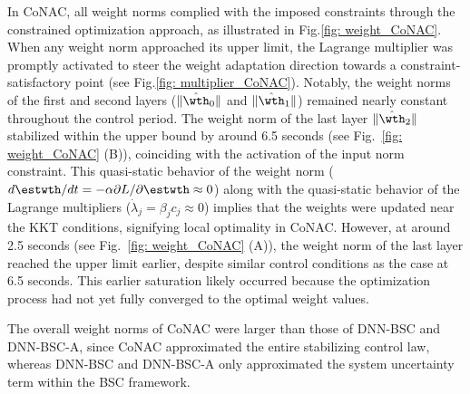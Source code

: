 \documentclass[lettersize,journal]{IEEEtran}
\begin{document}
In CoNAC, all weight norms complied with the imposed constraints through the constrained optimization approach, as illustrated in Fig.\ref{fig: weight_CoNAC}. When any weight norm approached its upper limit, the Lagrange multiplier was promptly activated to steer the weight adaptation direction towards a constraint-satisfactory point (see Fig.\ref{fig: multiplier_CoNAC}). Notably, the weight norms of the first and second layers ($\Vert {{{\hat \wth }_0}} \Vert$ and $\Vert {{{\hat \wth }_1}} \Vert$) remained nearly constant throughout the control period. The weight norm of the last layer $\Vert {{{\hat \wth }_2}} \Vert$ stabilized within the upper bound by around 6.5 seconds (see Fig.~\ref{fig: weight_CoNAC} (B)), coinciding with the activation of the input norm constraint. This quasi-static behavior of the weight norm (\ie $d{\estwth}/dt=-\alpha\partial L/\partial \estwth \approx 0$) along with the quasi-static behavior of the Lagrange multipliers (\ie $\dot\lambda_j = \beta_j c_j \approx 0$) implies that the weights were updated near the KKT conditions, signifying local optimality in CoNAC. However, at around 2.5 seconds (see Fig.~\ref{fig: weight_CoNAC} (A)), the weight norm of the last layer reached the upper limit earlier, despite similar control conditions as the case at 6.5 seconds. This earlier saturation likely occurred because the optimization process had not yet fully converged to the optimal weight values.

The overall weight norms of CoNAC were larger than those of DNN-BSC and DNN-BSC-A, since CoNAC approximated the entire stabilizing control law, whereas DNN-BSC and DNN-BSC-A only approximated the system uncertainty term within the BSC framework.



\end{document}
